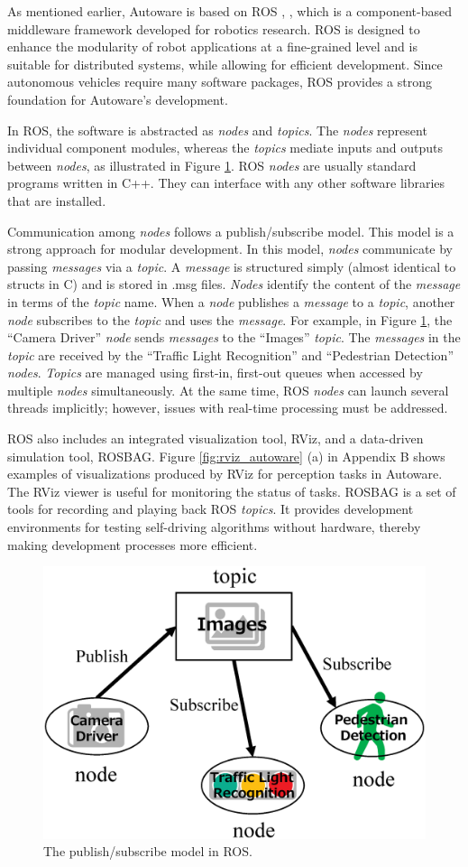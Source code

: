 As mentioned earlier, Autoware is based on ROS \cite{quigley2009ros},
\cite{rosorg}, which is a component-based middleware framework developed
for robotics research.
ROS is designed to enhance the modularity of robot applications at a
fine-grained level and is suitable for distributed systems, while
allowing for efficient development.
Since autonomous vehicles require many software packages, ROS provides a
strong foundation for Autoware's development.

In ROS, the software is abstracted as \emph{nodes} and \emph{topics}.
The \emph{nodes} represent individual component modules, whereas the \emph{topics} mediate inputs and outputs between \emph{nodes}, as illustrated in Figure \ref{fig:ros_pubsub}.
ROS \emph{nodes} are usually standard programs written in C++.
They can interface with any other software libraries that are installed.

Communication among \emph{nodes} follows a publish/subscribe model.
This model is a strong approach for modular development.
In this model, \emph{nodes} communicate by passing \emph{messages} via a \emph{topic}. 
A \emph{message} is structured simply (almost identical to structs in C) and is stored in .msg files.
\emph{Nodes} identify the content of the \emph{message} in terms of the \emph{topic} name.
When a \emph{node} publishes a \emph{message} to a \emph{topic}, another \emph{node} subscribes to the \emph{topic} and uses the \emph{message}. 
For example, in Figure \ref{fig:ros_pubsub}, the ``Camera Driver'' \emph{node} sends \emph{messages} to the ``Images'' \emph{topic}. 
The \emph{messages} in the \emph{topic} are received by the ``Traffic Light Recognition'' and ``Pedestrian Detection'' \emph{nodes}.
\emph{Topics} are managed using first-in, first-out queues when accessed by multiple \emph{nodes} simultaneously.
At the same time, ROS \emph{nodes} can launch several threads implicitly; however,
issues with real-time processing must be addressed.

ROS also includes an integrated visualization tool, RViz, and a
data-driven simulation tool, ROSBAG. 
Figure \ref{fig:rviz_autoware} (a) in Appendix B shows examples of visualizations produced by RViz for perception tasks in Autoware.
The RViz viewer is useful for monitoring the status of tasks.
ROSBAG is a set of tools for recording and playing back ROS \emph{topics}.
It provides development environments for testing self-driving algorithms without hardware, thereby making development processes more efficient.

\begin{figure}[thbp]
  \centering
  \includegraphics[width=0.8\linewidth]{../figure/ros_pubsub.eps}
  \caption{\label{fig:ros_pubsub}
 The publish/subscribe model in ROS.}
\end{figure}

